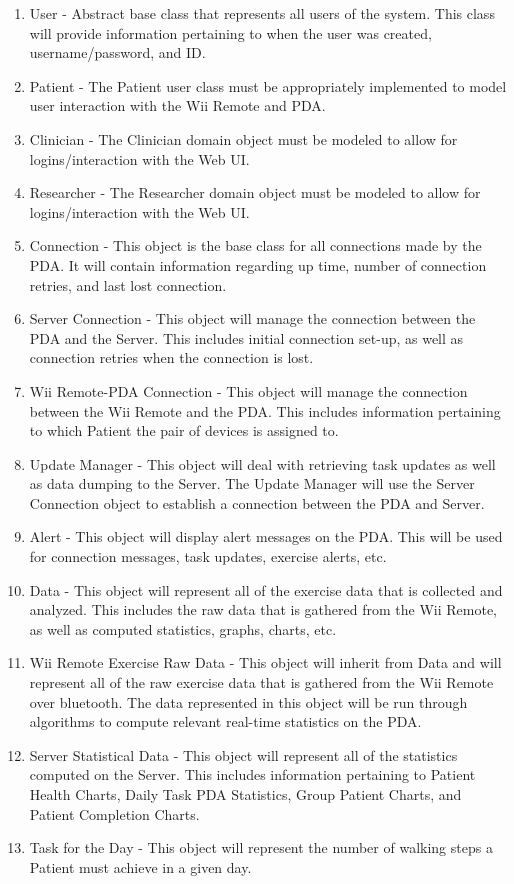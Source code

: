 \documentclass{article}
\begin{document}
\begin{enumerate}
\item User - Abstract base class that represents all users of the system. This class will provide information pertaining to when the user was created, username/password, and ID. 
\item Patient - The Patient user class must be appropriately implemented to model user interaction with the Wii Remote and PDA.
\item Clinician - The Clinician domain object must be modeled to allow for logins/interaction with the Web UI.  
\item Researcher - The Researcher domain object must be modeled to allow for logins/interaction with the Web UI. 
\item Connection - This object is the base class for all connections made by the PDA. It will contain information regarding up time, number of connection retries, and last lost connection.
\item Server Connection - This object will manage the connection between the PDA and the Server. This includes initial connection set-up, as well as connection retries when the connection is lost. 
\item Wii Remote-PDA Connection - This object will manage the connection between the Wii Remote and the PDA. This includes information pertaining to which Patient the pair of devices is assigned to.
\item Update Manager - This object will deal with retrieving task updates as well as data dumping to the Server. The Update Manager will use the Server Connection object to establish a connection between the PDA and Server.
\item Alert - This object will display alert messages on the PDA. This will be used for connection messages, task updates, exercise alerts, etc.   
\item Data - This object will represent all of the exercise data that is collected and analyzed. This includes the raw data that is gathered from the Wii Remote, as well as computed statistics, graphs, charts, etc. 
\item Wii Remote Exercise Raw Data - This object will inherit from Data and will represent all of the raw exercise data that is gathered from the Wii Remote over bluetooth. The data represented in this object will be run through algorithms to compute relevant real-time statistics on the PDA. 
\item Server Statistical Data - This object will represent all of the statistics computed on the Server. This includes information pertaining to Patient Health Charts, Daily Task PDA Statistics, Group Patient Charts, and Patient Completion Charts.  
\item Task for the Day - This object will represent the number of walking steps a Patient must achieve in a given day. 
\end{enumerate}
\end{document}
